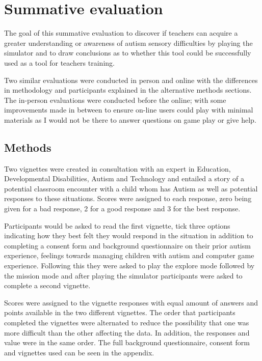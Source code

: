 
\chapter{Summative evaluation}
The goal of this summative evaluation to discover if teachers can acquire a greater understanding or awareness of autism sensory difficulties by playing the simulator and to draw conclusions as to whether this tool could be successfully used as a tool for teachers training. 

Two similar evaluations were conducted in person and online with the differences in methodology and participants explained in the alternative methods sections. The in-person evaluations were conducted before the online; with some improvements made in between to ensure on-line users could play with minimal materials as I would not be there to answer questions on game play or give help. 


\section{Methods}
Two vignettes were created in consultation with an expert in Education, Developmental Disabilities, Autism and Technology and entailed a story of a potential classroom encounter with a child whom has Autism as well as potential responses to these situations. Scores were assigned to each response, zero being given for a bad response, 2 for a good response and 3 for the best response.

Participants would be asked to read the first vignette, tick three options indicating how they best felt they would respond in the situation in addition to completing a consent form and background questionnaire on their prior autism experience, feelings towards managing children with autism and computer game experience. Following this they were asked to play the explore mode followed by the mission mode and after playing the simulator participants were asked to complete a second vignette. 

Scores were assigned to the vignette responses with equal amount of answers and points available in the two different vignettes. The order that participants completed the vignettes were alternated to reduce the possibility that one was more difficult than the other affecting the data. In addition, the responses and value were in the same order. The full background questionnaire, consent form and vignettes used can be seen in the appendix.

